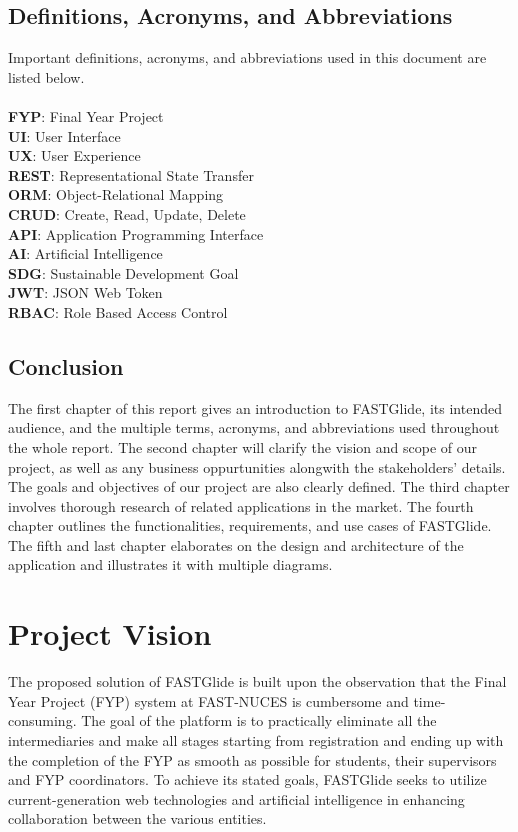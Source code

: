 \documentclass{FastFyp}
\begin{document}
\section{Definitions, Acronyms, and Abbreviations}
Important definitions, acronyms, and abbreviations used in this document are listed below.
\\ \\
\textbf{FYP}: Final Year Project\\
\textbf{UI}: User Interface\\
\textbf{UX}: User Experience\\
\textbf{REST}: Representational State Transfer\\
\textbf{ORM}: Object-Relational Mapping\\
\textbf{CRUD}: Create, Read, Update, Delete\\
\textbf{API}: Application Programming Interface \\
\textbf{AI}: Artificial Intelligence \\
\textbf{SDG}: Sustainable Development Goal\\
\textbf{JWT}: JSON Web Token\\
\textbf{RBAC}: Role Based Access Control
\section{Conclusion}
The first chapter of this report gives an introduction to FASTGlide, its intended audience, and the multiple terms, acronyms, and abbreviations used throughout the whole report. The second chapter will clarify the vision and scope of our project, as well as any business oppurtunities alongwith the stakeholders’ details. The goals and objectives of our project are also clearly defined. The third chapter involves thorough research of related applications in the market. The fourth chapter outlines the functionalities, requirements, and use cases of FASTGlide. The fifth and last chapter elaborates on the design and architecture of the application and illustrates it with multiple diagrams.
\chapter{Project Vision}
The proposed solution of FASTGlide is built upon the observation that the Final Year Project (FYP) system at FAST-NUCES is cumbersome and time-consuming. The goal of the platform is to practically eliminate all the intermediaries and make all stages starting from registration and ending up with the completion of the FYP as smooth as possible for students, their supervisors and FYP coordinators. To achieve its stated goals, FASTGlide seeks to utilize current-generation web technologies and artificial intelligence in enhancing collaboration between the various entities.
\end{document}
